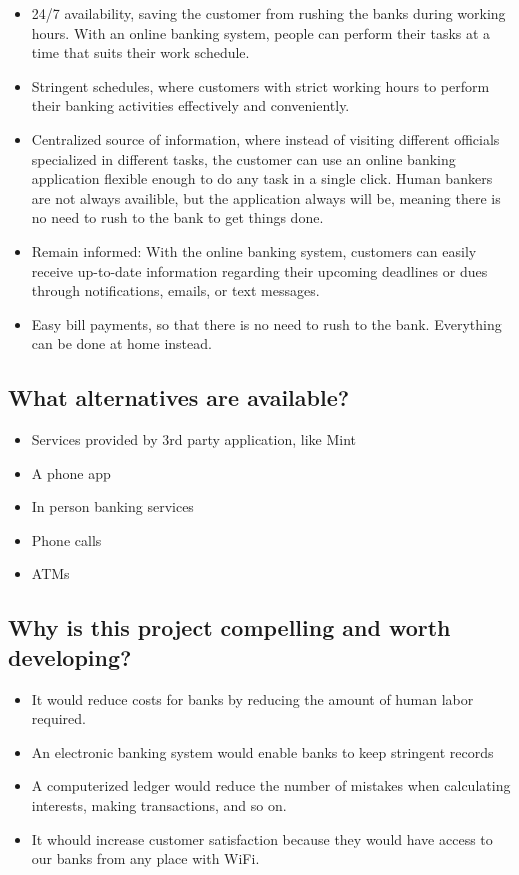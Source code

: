 \documentclass[
10pt, %
a4paper, %
oneside, %
headinclude,footinclude, %
BCOR5mm, %
]{scrartcl}
\begin{document}
\begin{itemize}
\item
  24/7 availability, saving the customer from rushing the banks during
  working hours. With an online banking system, people can perform their
  tasks at a time that suits their work schedule.
\item
  Stringent schedules, where customers with strict working hours to
  perform their banking activities effectively and conveniently.
\item
  Centralized source of information, where instead of visiting different
  officials specialized in different tasks, the customer can use an
  online banking application flexible enough to do any task in a single
  click. Human bankers are not always availible, but the application
  always will be, meaning there is no need to rush to the bank to get
  things done.
\item
  Remain informed: With the online banking system, customers can easily
  receive up-to-date information regarding their upcoming deadlines or
  dues through notifications, emails, or text messages.
\item
  Easy bill payments, so that there is no need to rush to the bank.
  Everything can be done at home instead.
\end{itemize}

\subsection{What alternatives are
available?}

\begin{itemize}
\item
  Services provided by 3rd party application, like Mint
\item
  A phone app
\item
  In person banking services
\item
  Phone calls
\item
  ATMs
\end{itemize}

\subsection{Why is this project compelling and worth
developing?}

\begin{itemize}
\item
  It would reduce costs for banks by reducing the amount of human labor
  required.
\item
  An electronic banking system would enable banks to keep stringent
  records
\item
  A computerized ledger would reduce the number of mistakes when
  calculating interests, making transactions, and so on.
\item
  It whould increase customer satisfaction because they would have
  access to our banks from any place with WiFi.
\end{itemize}
\end{document}
